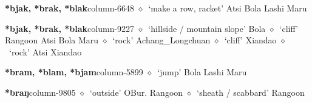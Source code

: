   \item {\footnotesize \textbf{*bjak, *brak, *blak}}{\tiny column-6648}
         $\diamond$~`make a row, racket'
         Atsi 
\hspace{1ex}
         Bola 
\hspace{1ex}
         Lashi 
\hspace{1ex}
         Maru 
  \item {\footnotesize \textbf{*bjak, *brak, *blak}}{\tiny column-9227}
         $\diamond$~`hillside / mountain slope'
         Bola 
\hspace{1ex}
         $\diamond$~`cliff'
         Rangoon 
\hspace{1ex}
         Atsi 
\hspace{1ex}
         Bola 
\hspace{1ex}
         Maru 
\hspace{1ex}
         $\diamond$~`rock'
         Achang\_Longchuan 
\hspace{1ex}
         $\diamond$~`cliff'
         Xiandao 
\hspace{1ex}
         $\diamond$~`rock'
         Atsi 
\hspace{1ex}
         Xiandao 
  \item {\footnotesize \textbf{*bram, *blam, *bjam}}{\tiny column-5899}
         $\diamond$~`jump'
         Bola 
\hspace{1ex}
         Lashi 
\hspace{1ex}
         Maru 
  \item {\footnotesize \textbf{*braŋ}}{\tiny column-9805}
         $\diamond$~`outside'
         OBur. 
\hspace{1ex}
         Rangoon 
\hspace{1ex}
         $\diamond$~`sheath / scabbard'
         Rangoon 
